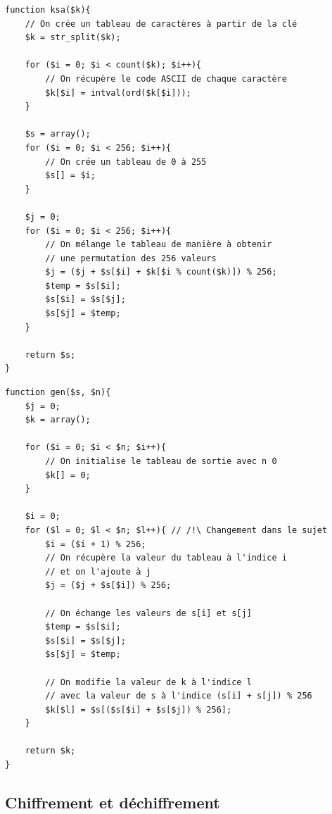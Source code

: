 \documentclass[12pt, a4paper]{article}
\begin{document}
\begin{lstlisting}[name=Fonction de génération de la permutation]
function ksa($k){
    // On crée un tableau de caractères à partir de la clé
    $k = str_split($k);
    
    for ($i = 0; $i < count($k); $i++){
        // On récupère le code ASCII de chaque caractère
        $k[$i] = intval(ord($k[$i]));
    }

    $s = array();
    for ($i = 0; $i < 256; $i++){
        // On crée un tableau de 0 à 255
        $s[] = $i;
    }

    $j = 0;
    for ($i = 0; $i < 256; $i++){
        // On mélange le tableau de manière à obtenir
        // une permutation des 256 valeurs
        $j = ($j + $s[$i] + $k[$i % count($k)]) % 256;
        $temp = $s[$i];
        $s[$i] = $s[$j];
        $s[$j] = $temp;
    }

    return $s;
}
\end{lstlisting}

\begin{lstlisting}[name=Fonction de génération de la suite chiffrante]
function gen($s, $n){
    $j = 0;
    $k = array();

    for ($i = 0; $i < $n; $i++){
        // On initialise le tableau de sortie avec n 0
        $k[] = 0;
    }
    
    $i = 0;
    for ($l = 0; $l < $n; $l++){ // /!\ Changement dans le sujet
        $i = ($i + 1) % 256;
        // On récupère la valeur du tableau à l'indice i
        // et on l'ajoute à j
        $j = ($j + $s[$i]) % 256;

        // On échange les valeurs de s[i] et s[j]
        $temp = $s[$i];
        $s[$i] = $s[$j];
        $s[$j] = $temp;

        // On modifie la valeur de k à l'indice l
        // avec la valeur de s à l'indice (s[i] + s[j]) % 256
        $k[$l] = $s[($s[$i] + $s[$j]) % 256];
    }

    return $k;
}
\end{lstlisting}

\subsection*{Chiffrement et déchiffrement}
\end{document}
